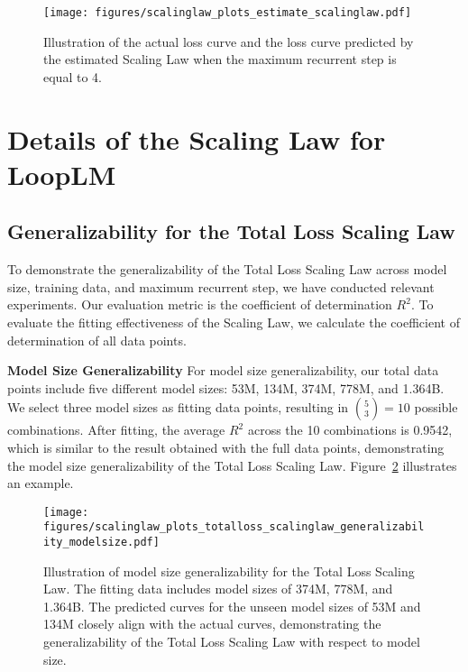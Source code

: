 \documentclass[]{bytedance_seed}
\newcommand{\1}{\mathbf{1}}
\newcommand{\ut}{LoopLM}
\begin{document}
\begin{figure}[htbp!]
    \centering
    \texttt{[image: figures/scalinglaw\_plots\_estimate\_scalinglaw.pdf]}
    \caption{Illustration of the actual loss curve and the loss curve predicted by the estimated Scaling Law when the maximum recurrent step is equal to 4.}
    \label{fig:scalinglaw_estimate_scalinglaw}
\end{figure}
\section{Details of the Scaling Law for \ut{}}
\subsection{Generalizability for the Total Loss Scaling Law}
\label{app:generalizabilty_exp_totalloss_scalinglaw}

To demonstrate the generalizability of the Total Loss Scaling Law across model size, training data, and maximum recurrent step, we have conducted relevant experiments. Our evaluation metric is the coefficient of determination $R^2$. To evaluate the fitting effectiveness of the Scaling Law, we calculate the coefficient of determination of all data points.

\textbf{Model Size Generalizability} For model size generalizability, our total data points include five different model sizes: 53M, 134M, 374M, 778M, and 1.364B. We select three model sizes as fitting data points, resulting in $\binom{5}{3}=10$ possible combinations. After fitting, the average $R^2$ across the 10 combinations is 0.9542, which is similar to the result obtained with the full data points, demonstrating the model size generalizability of the Total Loss Scaling Law. Figure~\ref{fig:totalloss_scalinglaw_generalizability_modelsize} illustrates an example.

\begin{figure}[htbp!]
    \centering
    \texttt{[image: figures/scalinglaw\_plots\_totalloss\_scalinglaw\_generalizability\_modelsize.pdf]}
    \caption{Illustration of model size generalizability for the Total Loss Scaling Law. The fitting data includes model sizes of 374M, 778M, and 1.364B. The predicted curves for the unseen model sizes of 53M and 134M closely align with the actual curves, demonstrating the generalizability of the Total Loss Scaling Law with respect to model size.}
    \label{fig:totalloss_scalinglaw_generalizability_modelsize}
\end{figure}
\end{document}
